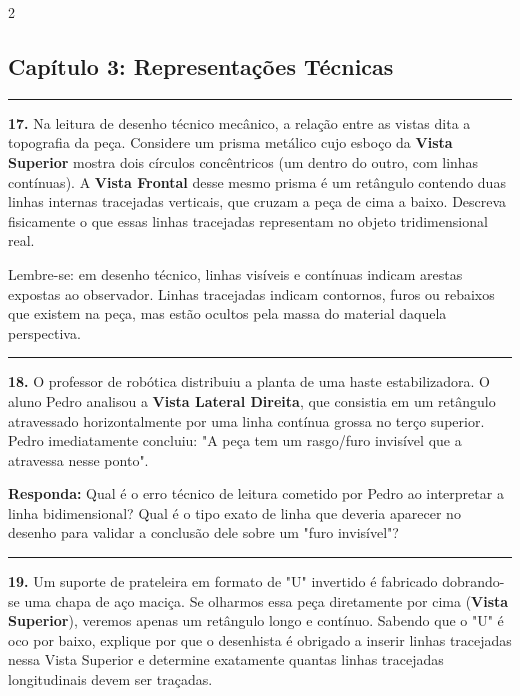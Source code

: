 \documentclass[twoside, 10pt, a4paper]{article}
\begin{document}
\begin{multicols*}{2}
\subsection*{Capítulo 3: Representações Técnicas}
\vspace{-0.2cm}\noindent\rule{\linewidth}{1.5pt} 
\par\par\vspace{0.5cm}
\textbf{17.} Na leitura de desenho técnico mecânico, a relação entre as vistas dita a topografia da peça. Considere um prisma metálico cujo esboço da \textbf{Vista Superior} mostra dois círculos concêntricos (um dentro do outro, com linhas contínuas). A \textbf{Vista Frontal} desse mesmo prisma é um retângulo contendo duas linhas internas tracejadas verticais, que cruzam a peça de cima a baixo. Descreva fisicamente o que essas linhas tracejadas representam no objeto tridimensional real.
\begin{boxdica}
    Lembre-se: em desenho técnico, linhas visíveis e contínuas indicam arestas expostas ao observador. Linhas tracejadas indicam contornos, furos ou rebaixos que existem na peça, mas estão ocultos pela massa do material daquela perspectiva.
\end{boxdica}
\par\vspace{0.5cm}

\noindent\textcolor{CorLinha}{\rule{\linewidth}{0.5pt}} 
\par\par\vspace{0.5cm}
\textbf{18.} O professor de robótica distribuiu a planta de uma haste estabilizadora. O aluno Pedro analisou a \textbf{Vista Lateral Direita}, que consistia em um retângulo atravessado horizontalmente por uma linha contínua grossa no terço superior. Pedro imediatamente concluiu: "A peça tem um rasgo/furo invisível que a atravessa nesse ponto".
\begin{boxresponda}
\textbf{Responda:} Qual é o erro técnico de leitura cometido por Pedro ao interpretar a linha bidimensional? Qual é o tipo exato de linha que deveria aparecer no desenho para validar a conclusão dele sobre um "furo invisível"?
\end{boxresponda}
\par\vspace{0.5cm}

\noindent\textcolor{CorLinha}{\rule{\linewidth}{0.5pt}} 
\par\par\vspace{0.5cm}
\textbf{19.} Um suporte de prateleira em formato de "U" invertido é fabricado dobrando-se uma chapa de aço maciça. Se olharmos essa peça diretamente por cima (\textbf{Vista Superior}), veremos apenas um retângulo longo e contínuo. Sabendo que o "U" é oco por baixo, explique por que o desenhista é obrigado a inserir linhas tracejadas nessa Vista Superior e determine exatamente quantas linhas tracejadas longitudinais devem ser traçadas.
\par\vspace{0.5cm}


\end{multicols*}
\end{document}
